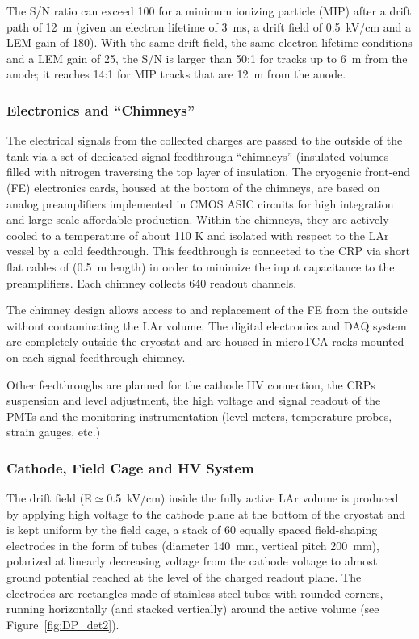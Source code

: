 The S/N ratio can exceed 100 for a minimum
ionizing particle (MIP) after a drift path of 12~m (given an
electron lifetime of 3~ms, a drift field of 0.5~kV/cm and a LEM gain
of 180). With the same drift field, the same electron-lifetime conditions and a
LEM gain of 25, the S/N is larger than 50:1 for tracks up to 6~m from
the anode; it reaches 14:1 for MIP tracks that are 12~m from the
anode.

\subsubsection{Electronics and ``Chimneys''}
 
The electrical signals from the collected charges
are passed to the outside of the tank via a set of dedicated signal
feedthrough ``chimneys'' (insulated volumes filled with nitrogen
traversing the top layer of insulation. 
The cryogenic front-end (FE) electronics cards, housed at the bottom of the
chimneys, are based on analog preamplifiers implemented in CMOS ASIC circuits for high integration and large-scale
affordable production. Within the chimneys, they are actively cooled to a temperature of about 110 K and
isolated with respect to the LAr vessel by a cold feedthrough.  This
feedthrough is connected to the CRP via short flat cables of (0.5~m length) in order to minimize the
input capacitance to the preamplifiers. Each chimney collects 640 readout channels.

The chimney design allows access to and replacement of the FE from the
outside without contaminating the LAr volume. The digital electronics
and DAQ system are completely outside the cryostat and are housed in
microTCA racks mounted on each signal feedthrough chimney. 

Other feedthroughs are planned for the cathode HV connection, the
CRPs suspension and level adjustment, the high voltage and signal
readout of the PMTs and the monitoring instrumentation (level meters,
temperature probes, strain gauges, etc.)

\subsubsection{Cathode, Field Cage and HV System}

The drift field (E${\simeq}$0.5~kV/cm) inside the fully
active LAr volume is produced by applying high voltage to the cathode
plane at the bottom of the cryostat and is kept uniform by the field cage, a stack
of 60 equally spaced field-shaping electrodes in the form of tubes
(diameter 140~mm,  vertical pitch 200~mm), polarized at linearly decreasing voltage from the cathode 
voltage to almost ground potential reached at the level of the charged readout plane.
The electrodes are rectangles made of stainless-steel tubes 
with rounded corners, running horizontally (and stacked vertically) around the
active volume (see Figure~\ref{fig:DP_det2}). 

